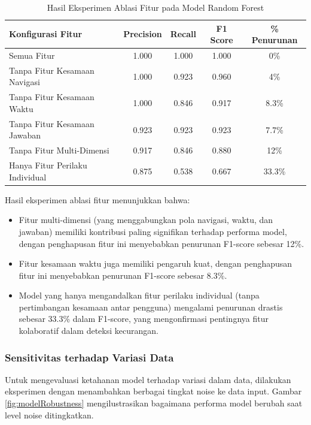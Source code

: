 \begin{table}[htbp]
\centering
\caption{Hasil Eksperimen Ablasi Fitur pada Model Random Forest}
\label{tabel:featureAblation}
\begin{tabular}{|l|c|c|c|c|}
\hline
\textbf{Konfigurasi Fitur} & \textbf{Precision} & \textbf{Recall} & \textbf{F1 Score} & \textbf{\% Penurunan} \\
\hline
Semua Fitur & 1.000 & 1.000 & 1.000 & 0\% \\
\hline
Tanpa Fitur Kesamaan Navigasi & 1.000 & 0.923 & 0.960 & 4\% \\
\hline
Tanpa Fitur Kesamaan Waktu & 1.000 & 0.846 & 0.917 & 8.3\% \\
\hline
Tanpa Fitur Kesamaan Jawaban & 0.923 & 0.923 & 0.923 & 7.7\% \\
\hline
Tanpa Fitur Multi-Dimensi & 0.917 & 0.846 & 0.880 & 12\% \\
\hline
Hanya Fitur Perilaku Individual & 0.875 & 0.538 & 0.667 & 33.3\% \\
\hline
\end{tabular}
\end{table}

Hasil eksperimen ablasi fitur menunjukkan bahwa:
\begin{itemize}
    \item Fitur multi-dimensi (yang menggabungkan pola navigasi, waktu, dan jawaban) memiliki kontribusi paling signifikan terhadap performa model, dengan penghapusan fitur ini menyebabkan penurunan F1-score sebesar 12\%.
    \item Fitur kesamaan waktu juga memiliki pengaruh kuat, dengan penghapusan fitur ini menyebabkan penurunan F1-score sebesar 8.3\%.
    \item Model yang hanya mengandalkan fitur perilaku individual (tanpa pertimbangan kesamaan antar pengguna) mengalami penurunan drastis sebesar 33.3\% dalam F1-score, yang mengonfirmasi pentingnya fitur kolaboratif dalam deteksi kecurangan.
\end{itemize}

\subsubsection{Sensitivitas terhadap Variasi Data}

Untuk mengevaluasi ketahanan model terhadap variasi dalam data, dilakukan eksperimen dengan menambahkan berbagai tingkat noise ke data input. Gambar \ref{fig:modelRobustness} mengilustrasikan bagaimana performa model berubah saat level noise ditingkatkan.

